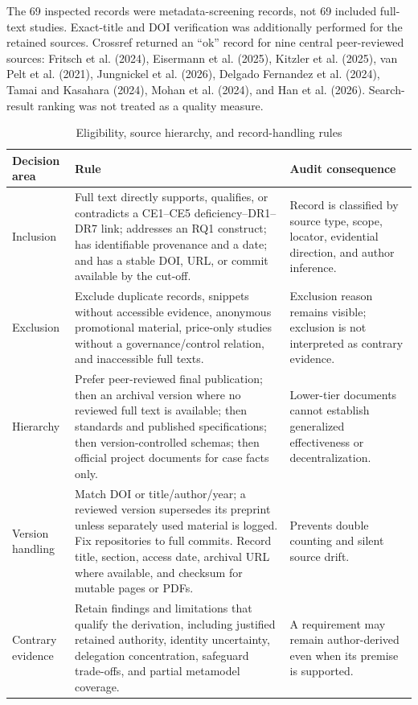 \documentclass[10pt]{article}
\begin{document}
The 69 inspected records were metadata-screening records, not 69 included
full-text studies. Exact-title and DOI verification was additionally performed
for the retained sources. Crossref returned an ``ok'' record for nine central
peer-reviewed sources: Fritsch et al. (2024), Eisermann et al. (2025), Kitzler
et al. (2025), van Pelt et al. (2021), Jungnickel et al. (2026), Delgado
Fernandez et al. (2024), Tamai and Kasahara (2024), Mohan et al. (2024), and
Han et al. (2026). Search-result ranking was not treated as a quality measure.

\begin{table}[h]
\caption{Eligibility, source hierarchy, and record-handling rules}
\centering
\small
\begin{tabularx}{\linewidth}{@{}p{.18\linewidth}YY@{}}
\toprule
Decision area & Rule & Audit consequence \\
\midrule
Inclusion & Full text directly supports, qualifies, or contradicts a CE1--CE5 deficiency--DR1--DR7 link; addresses an RQ1 construct; has identifiable provenance and a date; and has a stable DOI, URL, or commit available by the cut-off. & Record is classified by source type, scope, locator, evidential direction, and author inference. \\
Exclusion & Exclude duplicate records, snippets without accessible evidence, anonymous promotional material, price-only studies without a governance/control relation, and inaccessible full texts. & Exclusion reason remains visible; exclusion is not interpreted as contrary evidence. \\
Hierarchy & Prefer peer-reviewed final publication; then an archival version where no reviewed full text is available; then standards and published specifications; then version-controlled schemas; then official project documents for case facts only. & Lower-tier documents cannot establish generalized effectiveness or decentralization. \\
Version handling & Match DOI or title/author/year; a reviewed version supersedes its preprint unless separately used material is logged. Fix repositories to full commits. Record title, section, access date, archival URL where available, and checksum for mutable pages or PDFs. & Prevents double counting and silent source drift. \\
Contrary evidence & Retain findings and limitations that qualify the derivation, including justified retained authority, identity uncertainty, delegation concentration, safeguard trade-offs, and partial metamodel coverage. & A requirement may remain author-derived even when its premise is supported. \\

\end{tabularx}
\end{table}
\end{document}
